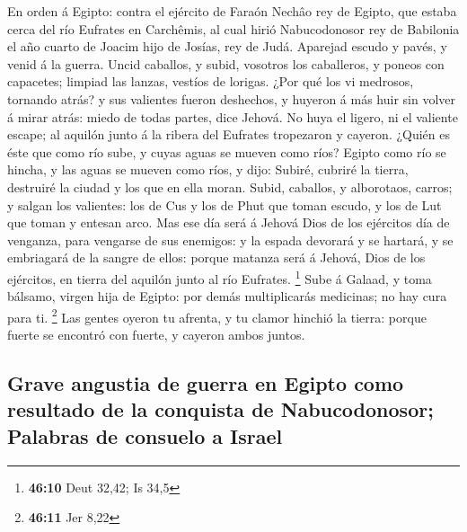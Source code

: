  En orden á Egipto: contra el ejército de Faraón Nechâo rey
de Egipto, que estaba cerca del río Eufrates en Carchêmis, al cual hirió
Nabucodonosor rey de Babilonia el año cuarto de Joacim hijo de Josías,
rey de Judá.  Aparejad escudo y pavés, y venid á la guerra.
 Uncid caballos, y subid, vosotros los caballeros, y poneos
con capacetes; limpiad las lanzas, vestíos de lorigas.  ¿Por
qué los vi medrosos, tornando atrás? y sus valientes fueron deshechos, y
huyeron á más huir sin volver á mirar atrás: miedo de todas partes, dice
Jehová.  No huya el ligero, ni el valiente escape; al
aquilón junto á la ribera del Eufrates tropezaron y cayeron.
 ¿Quién es éste que como río sube, y cuyas aguas se mueven
como ríos?  Egipto como río se hincha, y las aguas se mueven
como ríos, y dijo: Subiré, cubriré la tierra, destruiré la ciudad y los
que en ella moran.  Subid, caballos, y alborotaos, carros; y
salgan los valientes: los de Cus y los de Phut que toman escudo, y los
de Lut que toman y entesan arco.  Mas ese día será á Jehová
Dios de los ejércitos día de venganza, para vengarse de sus enemigos: y
la espada devorará y se hartará, y se embriagará de la sangre de ellos:
porque matanza será á Jehová, Dios de los ejércitos, en tierra del
aquilón junto al río Eufrates. \footnote{\textbf{46:10} Deut 32,42; Is
  34,5}  Sube á Galaad, y toma bálsamo, virgen hija de
Egipto: por demás multiplicarás medicinas; no hay cura para ti.
\footnote{\textbf{46:11} Jer 8,22}  Las gentes oyeron tu
afrenta, y tu clamor hinchió la tierra: porque fuerte se encontró con
fuerte, y cayeron ambos juntos.

\hypertarget{grave-angustia-de-guerra-en-egipto-como-resultado-de-la-conquista-de-nabucodonosor-palabras-de-consuelo-a-israel}{%
\subsection{Grave angustia de guerra en Egipto como resultado de la
conquista de Nabucodonosor; Palabras de consuelo a
Israel}\label{grave-angustia-de-guerra-en-egipto-como-resultado-de-la-conquista-de-nabucodonosor-palabras-de-consuelo-a-israel}}

